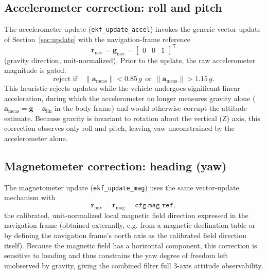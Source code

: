 \documentclass[11pt]{article}
\newcommand{\vect}[1]{\bm{#1}}
\newcommand{\transpose}{^{\mathsf{T}}}
\begin{document}
\subsection{Accelerometer correction: roll and pitch}

The accelerometer update (\texttt{ekf\_update\_accel}) invokes the generic vector update of Section~\ref{sec:update} with the navigation-frame reference
\begin{equation}
\vect r_{\text{nav}} = \vect g_{\text{nav}} = \begin{bmatrix}0 & 0 & 1\end{bmatrix}\transpose
\end{equation}
(gravity direction, unit-normalized). Prior to the update, the raw accelerometer magnitude is gated:
\begin{equation}
\text{reject if}\quad \lVert \vect a_{\text{meas}}\rVert < 0.85\,g \ \ \text{or}\ \ \lVert \vect a_{\text{meas}}\rVert > 1.15\,g .
\label{eq:accgate}
\end{equation}
This heuristic rejects updates while the vehicle undergoes significant linear acceleration, during which the accelerometer no longer measures gravity alone ($\vect a_{\text{meas}} = \vect g - \vect a_{\text{lin}}$ in the body frame) and would otherwise corrupt the attitude estimate. Because gravity is invariant to rotation about the vertical (Z) axis, this correction observes only roll and pitch, leaving yaw unconstrained by the accelerometer alone.

\subsection{Magnetometer correction: heading (yaw)}

The magnetometer update (\texttt{ekf\_update\_mag}) uses the same vector-update mechanism with
\begin{equation}
\vect r_{\text{nav}} = \vect r_{\text{mag}} = \texttt{cfg.mag\_ref},
\end{equation}
the calibrated, unit-normalized local magnetic field direction expressed in the navigation frame (obtained externally, e.g. from a magnetic-declination table or by defining the navigation frame's north axis as the calibrated field direction itself). Because the magnetic field has a horizontal component, this correction is sensitive to heading and thus constrains the yaw degree of freedom left unobserved by gravity, giving the combined filter full 3-axis attitude observability.
\end{document}
